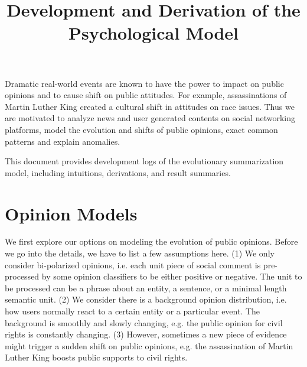 \documentclass[11pt]{report}
\begin{document}
\title{Development and Derivation of the Psychological Model}
\maketitle
Dramatic real-world events are known to have the power to impact on public opinions and to cause shift on public attitudes. For example, assassinations of Martin Luther King created a cultural shift in attitudes on race issues. Thus we are motivated to analyze news and user generated contents on social networking platforms, model the evolution and shifts of public opinions,  exact common patterns and explain anomalies.

This document provides development logs of the evolutionary summarization model, including intuitions, derivations, and result summaries.


\part{Opinion Models}
We first explore our options on modeling the evolution of public opinions. Before we go into the details, we have to list a few assumptions here. (1) We only consider bi-polarized opinions, i.e. each unit piece of social comment is pre-processed by some opinion classifiers to be either positive or negative. The unit to be processed can be a phrase about an entity, a sentence, or a minimal length semantic unit. (2) We consider there is a background opinion distribution, i.e. how users normally react to a certain entity or a particular event. The background is smoothly and slowly changing, e.g. the public opinion for civil rights is constantly changing. (3) However, sometimes a new piece of evidence might trigger a sudden shift on public opinions, e.g. the assassination of Martin Luther King boosts public  supports to civil rights.  
    
\end{document}
